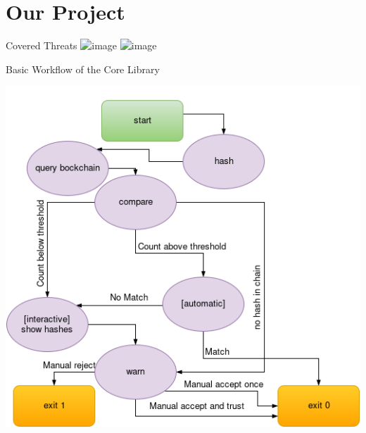 \documentclass{beamer}
\begin{document}
\section{Our Project}

\begin{frame}{Covered Threats}
\includegraphics<1>[width=\textwidth]{threat.png}
\includegraphics<2>[width=\textwidth]{threat2.png} 
\end{frame}

\begin{frame}{Basic Workflow of the Core Library}
\begin{center}
\includegraphics[height=0.9\textheight]{workflow.png}
\end{center}
\end{frame}
\end{document}
